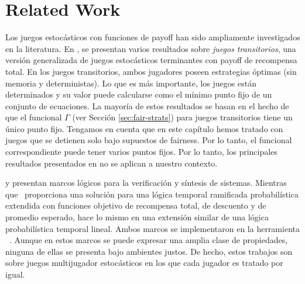 	
	
	

\section{Related Work} \label{sec:related_work}

Los juegos estocásticos con funciones de payoff han sido ampliamente investigados en la literatura. En \cite{FilarV96}, se presentan varios resultados sobre \emph{juegos transitorios},
una versión generalizada de juegos estocásticos terminantes con payoff de recompensa total.
En los juegos transitorios, ambos jugadores poseen estrategias óptimas (sin memoria y deterministas).
Lo que es más importante, los juegos están determinados y su valor puede calcularse como el mínimo punto fijo de un conjunto de ecuaciones.
La mayoría de estos resultados se basan en el hecho de que el funcional $\Gamma$ (ver Sección \ref{sec:fair-strats}) para juegos transitorios tiene un único punto fijo.
Tengamos en cuenta que en este capítulo hemos tratado con juegos que se detienen solo bajo supuestos de fairness. Por lo tanto, el funcional correspondiente
puede tener varios puntos fijos. Por lo tanto, los principales resultados presentados en \cite{FilarV96} no se aplican a nuestro contexto.

\cite{DBLP:journals/fmsd/ChenFKPS13} y \cite{SvorenovaKwiatkowska16} presentan marcos lógicos para la verificación y síntesis de sistemas. Mientras que~\cite{DBLP:journals/fmsd/ChenFKPS13} proporciona una solución para una lógica temporal ramificada probabilística extendida con funciones objetivo de recompensa total, de descuento y de promedio esperado, \cite{SvorenovaKwiatkowska16} hace lo mismo en una extensión similar de una lógica probabilística temporal lineal. Ambos marcos se implementaron en la herramienta \Prism~\cite{DBLP:conf/cav/KwiatkowskaN0S20,DBLP:conf/cav/KwiatkowskaNP11}. Aunque en estos marcos se puede expresar una amplia clase de propiedades, ninguna de ellas se presenta bajo ambientes justos. De hecho, estos trabajos son sobre juegos multijugador estocásticos en los que cada jugador es tratado por igual.



